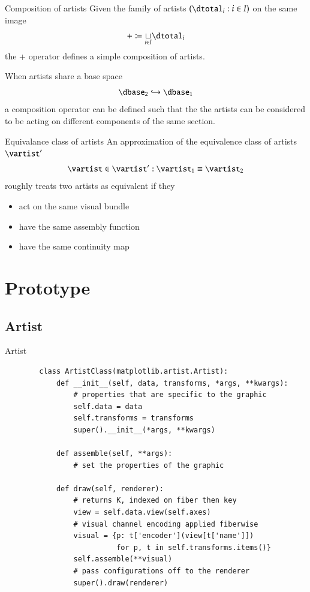 \documentclass[xcolor={dvipsnames}, handout]{beamer}
\begin{document}
\begin{frame}{Composition of artists}
    Given the family of artists $(\dtotal_i: i\in I)$ on the same image
    \begin{equation}
        + \coloneqq \underset{i\in I}{\sqcup} \dtotal_{i}
    \end{equation}
    the + operator defines a simple composition of artists. 

    When artists share a base space 
    \begin{equation}
        \dbase_2 \hookrightarrow \dbase_1
    \end{equation}
    a composition operator can be defined such that the the artists can be considered to be acting on different components of the same section. 
\end{frame}
\begin{frame}{Equivalance class of artists}
    An approximation of the equivalence class of artists $\vartist^{\prime}$
    \begin{equation}
    \vartist \in \vartist^{\prime}: \vartist_{1} \equiv \vartist_{2}
    \end{equation}
    roughly treats two artists as equivalent if they 
    \begin{itemize}
        \item act on the same visual bundle \vtotal
        \item have the same assembly function \vmarkd 
        \item have the same continuity map \vindex 
    \end{itemize}
\end{frame}


\section{Prototype}
\subsection{Artist}
\begin{frame}[fragile]{Artist}
    \begin{verbatim}
        class ArtistClass(matplotlib.artist.Artist):
            def __init__(self, data, transforms, *args, **kwargs):
                # properties that are specific to the graphic
                self.data = data 
                self.transforms = transforms
                super().__init__(*args, **kwargs)
        
            def assemble(self, **args):
                # set the properties of the graphic
        
            def draw(self, renderer):
                # returns K, indexed on fiber then key 
                view = self.data.view(self.axes) 
                # visual channel encoding applied fiberwise 
                visual = {p: t['encoder'](view[t['name']])
                          for p, t in self.transforms.items()}
                self.assemble(**visual)
                # pass configurations off to the renderer
                super().draw(renderer)
        \end{verbatim}
\end{frame}
\end{document}

